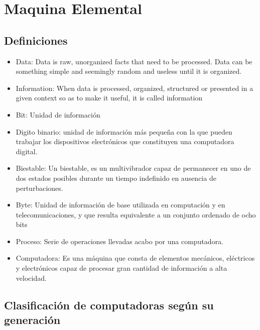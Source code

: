 \section{Maquina Elemental}

\subsection{Definiciones}
\begin{itemize}
\item Data: Data is raw, unorganized facts that need to be processed. Data can be something simple and seemingly random and useless until it is organized.
\item Information: When data is processed, organized, structured or presented in a given context so as to make it useful, it is called information
\item Bit: Unidad de información
\item Digito binario: unidad de información más pequeña con la que pueden trabajar los dispositivos electrónicos que constituyen una computadora digital.
\item Biestable: Un biestable, es un multivibrador capaz de permanecer en uno de dos estados posibles durante un tiempo indefinido en ausencia de perturbaciones.
\item Byte: Unidad de información de base utilizada en computación y en telecomunicaciones, y que resulta equivalente a un conjunto ordenado de ocho bits
\item Proceso: Serie de operaciones llevadas acabo por una computadora.
\item Computadora: Es una máquina que consta de elementos mecánicos, eléctricos y electrónicos capaz de procesar gran cantidad de información a alta velocidad.
\end{itemize}

\subsection{Clasificación de computadoras según su generación}

